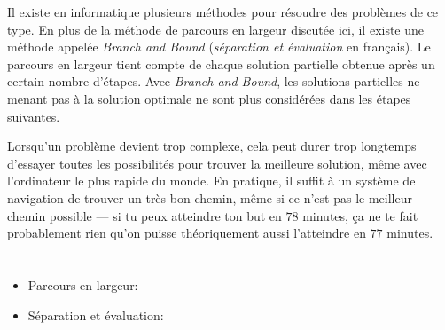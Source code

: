 {{Il existe en informatique plusieurs méthodes pour résoudre des problèmes de ce type. En plus de la méthode de parcours en largeur discutée ici, il existe une méthode appelée \emph{Branch and Bound} (\emph{séparation et évaluation} en français). Le parcours en largeur tient compte de chaque solution partielle obtenue après un certain nombre d’étapes. Avec \emph{Branch and Bound}, les solutions partielles ne menant pas à la solution optimale ne sont plus considérées dans les étapes suivantes.

Lorsqu’un problème devient trop complexe, cela peut durer trop longtemps d’essayer toutes les possibilités pour trouver la meilleure solution, même avec l’ordinateur le plus rapide du monde. En pratique,  il suffit à un système de navigation de trouver un très bon chemin, même si ce n’est pas le meilleur chemin possible — si tu peux atteindre ton but en $78$ minutes, ça ne te fait probablement rien qu’on puisse théoriquement aussi l’atteindre en $77$ minutes.



\section*{\BrochureWebsitesAndKeywords}
{\raggedright
\begin{itemize}
  \item Parcours en largeur: \href{https://fr.wikipedia.org/wiki/Algorithme_de_parcours_en_largeur}{}
  \item Séparation et évaluation: \href{https://fr.wikipedia.org/wiki/S\%C3\%A9paration_et_\%C3\%A9valuation}{}
\end{itemize}


}

}{}

\def\AuthorSiaulysT{} %
\def\AuthorCoolsaetK{} %
\def\AuthorZaluksneM{} %
\def\AuthorDatzkoS{} %
\def\AuthorWeigendM{} %
\def\AuthorPelletE{} %

\newpage}{}
